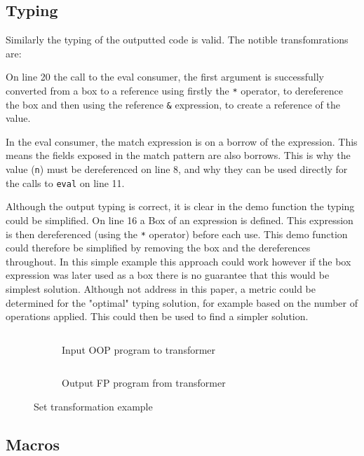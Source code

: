 \documentclass[ oneside,%
                    author={James Elgar},
                    degree={MEng},
                     title={Bidirectional transformer between functional and \\ object-oriented programming in Rust},
                  subtitle={}]{dissertation}
\newcommand{\rust}[1]{\texttt{#1}}
\newcommand{\codefile}[2]{\inputminted[xleftmargin=20pt,linenos, breaklines]{#1}{#2}}
\newcommand{\rustfile}[1]{\codefile{rust}{../#1.rs}}
\newcommand{\rustexample}[1]{\rustfile{examples/src/#1}}
\newcommand{\rustoutput}[1]{\rustfile{outputs/src/#1}}
\begin{document}
\subsection{Typing}

Similarly the typing of the outputted code is valid. The notible transfomrations are:

On line 20 the call to the eval consumer, the first argument is successfully converted from a box to a reference using firstly the \rust{*} operator, to dereference the box and then using the reference \rust{&} expression, to create a reference of the value.

In the eval consumer, the match expression is on a borrow of the expression. This means the fields exposed in the match pattern are also borrows. This is why the value (\rust{n}) must be dereferenced on line 8, and why they can be used directly for the calls to \rust{eval} on line 11.

Although the output typing is correct, it is clear in the demo function the typing could be simplified. On line 16 a Box of an expression is defined. This expression is then dereferenced (using the \rust{*} operator) before each use. This demo function could therefore be simplified by removing the box and the dereferences throughout. In this simple example this approach could work however if the box expression was later used as a box there is no guarantee that this would be simplest solution. Although not address in this paper, a metric could be determined for the "optimal" typing solution, for example based on the number of operations applied. This could then be used to find a simpler solution.


\begin{figure}
\centering
\begin{subfigure}{.5\textwidth}
    \rustexample{exp/oop}
    \caption{Input OOP program to transformer}
    \label{fig:trans-set-ex-input}
\end{subfigure}%
\begin{subfigure}{.5\textwidth}
    \rustoutput{exp/oop}
    \caption{Output FP program from transformer}
    \label{fig:trans-set-ex-output}
\end{subfigure}
\caption{Set transformation example}
\label{fig:trans-set-ex}
\end{figure}

\subsection{Macros}
\end{document}
